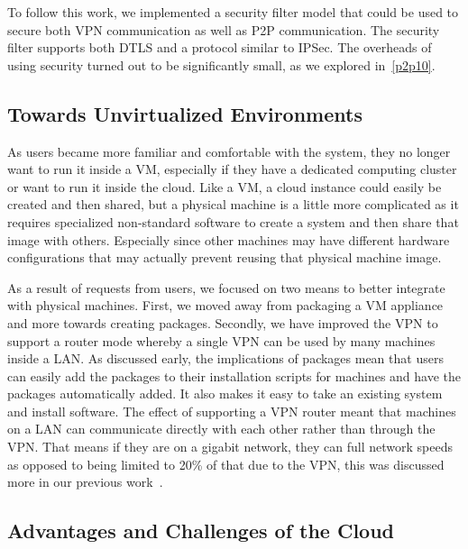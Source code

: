 \documentclass[conference]{IEEEtran}
\begin{document}
To follow this work, we implemented a security filter model that could be used
to secure both VPN communication as well as P2P communication.  The security
filter supports both DTLS and a protocol similar to IPSec.  The overheads of
using security turned out to be significantly small, as we explored
in~\ref{p2p10}.

\subsection{Towards Unvirtualized Environments}

As users became more familiar and comfortable with the system, they no longer
want to run it inside a VM, especially if they have a dedicated computing
cluster or want to run it inside the cloud.  Like a VM, a cloud instance could
easily be created and then shared, but a physical machine is a little more
complicated as it requires specialized non-standard software to create a system
and then share that image with others.  Especially since other machines may
have different hardware configurations that may actually prevent reusing that
physical machine image.

As a result of requests from users, we focused on two means to better integrate
with physical machines.  First, we moved away from packaging a VM appliance and
more towards creating packages.  Secondly, we have improved the VPN to support
a router mode whereby a single VPN can be used by many machines inside a LAN.
As discussed early, the implications of packages mean that users can easily add
the packages to their installation scripts for machines and have the packages
automatically added.  It also makes it easy to take an existing system and
install software.  The effect of supporting a VPN router meant that machines on
a LAN can communicate directly with each other rather than through the VPN.
That means if they are on a gigabit network, they can full network speeds as
opposed to being limited to 20\% of that due to the VPN, this was discussed
more in our previous work~\cite{sc09}.

\subsection{Advantages and Challenges of the Cloud}
\end{document}
